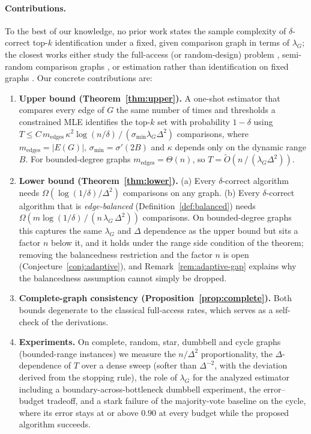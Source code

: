 \documentclass[11pt]{article}
\theoremstyle{definition}
\newcommand{\lG}{\lambda_G}
\begin{document}
\paragraph{Contributions.}  To the best of our knowledge, no prior work states the sample complexity of $\delta$-correct top-$k$ identification under a fixed, given comparison graph in terms of $\lG$; the closest works either study the full-access (or random-design) problem \cite{shah2015simple,chen2017spectral,goldberger2026optimal}, semi-random comparison graphs \cite{yang2024topk}, or estimation rather than identification on fixed graphs \cite{yang2026graphmonotone,li2021ellinftybounds}.  Our concrete contributions are:
\begin{enumerate}
\item \textbf{Upper bound (Theorem~\ref{thm:upper}).}  A one-shot estimator that compares every edge of $G$ the same number of times and thresholds a constrained MLE identifies the top-$k$ set with probability $1-\delta$ using
$T \le C\, m_{\mathrm{edges}}\,\kappa^2 \log(n/\delta)\,/\,(\sigma_{\min}\lG\Delta^2)$
comparisons, where $m_{\mathrm{edges}}=|E(G)|$, $\sigma_{\min}=\sigma'(2B)$ and $\kappa$ depends only on the dynamic range $B$.  For bounded-degree graphs $m_{\mathrm{edges}}=\Theta(n)$, so $T = \tilde O(n\,/\,(\lG\Delta^2))$.
\item \textbf{Lower bound (Theorem~\ref{thm:lower}).}  (a) Every $\delta$-correct algorithm needs $\Omega(\log(1/\delta)/\Delta^2)$ comparisons on any graph.  (b) Every $\delta$-correct algorithm that is \emph{edge-balanced} (Definition~\ref{def:balanced}) needs $\Omega\!\left(m\log(1/\delta)\,/\,(n\,\lG\,\Delta^2)\right)$ comparisons.  On bounded-degree graphs this captures the same $\lG$ and $\Delta$ dependence as the upper bound but sits a factor $n$ below it, and it holds under the range side condition of the theorem; removing the balancedness restriction and the factor $n$ is open (Conjecture~\ref{conj:adaptive}), and Remark~\ref{rem:adaptive-gap} explains why the balancedness assumption cannot simply be dropped.
\item \textbf{Complete-graph consistency (Proposition~\ref{prop:complete}).}  Both bounds degenerate to the classical full-access rates, which serves as a self-check of the derivations.
\item \textbf{Experiments.}  On complete, random, star, dumbbell and cycle graphs (bounded-range instances) we measure the $n/\Delta^2$ proportionality, the $\Delta$-dependence of $T$ over a dense sweep (softer than $\Delta^{-2}$, with the deviation derived from the stopping rule), the role of $\lG$ for the analyzed estimator including a boundary-across-bottleneck dumbbell experiment, the error--budget tradeoff, and a stark failure of the majority-vote baseline on the cycle, where its error stays at or above $0.90$ at every budget while the proposed algorithm succeeds.
\end{enumerate}
\end{document}
